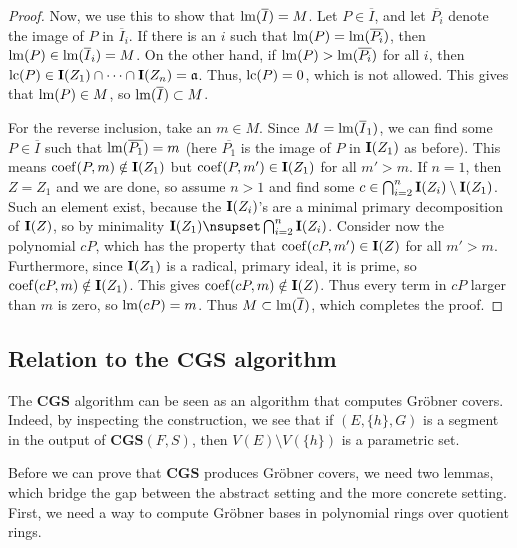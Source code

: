 \begin{proof}
  Now, we use this to show that $\operatorname{lm}(\overline I) = M$. Let $P \in \overline I$, and let $\overline{P_{i}}$ denote the image of $P$ in $\overline I_{i}$. If there is an $i$ such that $\operatorname{lm}(P) = \operatorname{lm}(\overline{P_{i}})$, then $\operatorname{lm}(P) \in \operatorname{lm}(\overline I_{i}) = M$. On the other hand, if $\operatorname{lm}(P) > \operatorname{lm}(\overline{P_{i}})$ for all $i$, then $\operatorname{lc}(P) \in \operatorname{\mathbf I}(Z_{1}) \cap \dots \cap \operatorname{\mathbf I}(Z_{n}) = \mathfrak{a}$. Thus, $\operatorname{lc}(P) = 0$, which is not allowed. This gives that $\operatorname{lm}(P) \in M$, so $\operatorname{lm}(\overline I) \subset M$.

  For the reverse inclusion, take an $m \in M$. Since $M = \operatorname{lm}(\overline I_{1})$, we can find some $P \in \overline I$ such that $\operatorname{lm}(\overline{P_{1}}) = m$ (here $\overline{P_{1}}$ is the image of $P$ in $\operatorname{\mathbf I}(Z_{1})$ as before). This means $\operatorname{coef}(P, m) \notin \operatorname{\mathbf I}(Z_{1})$ but $\operatorname{coef}(P, m') \in \operatorname{\mathbf I}(Z_{1})$ for all $m' > m$. If $n = 1$, then $Z = Z_{1}$ and we are done, so assume $n > 1$ and find some $c \in \bigcap_{i=2}^{n} \operatorname{\mathbf I}(Z_{i}) \setminus \operatorname{\mathbf I}(Z_{1})$. Such an element exist, because the $\operatorname{\mathbf I}(Z_{i})$'s are a minimal primary decomposition of $\operatorname{\mathbf I}(Z)$, so by minimality $\I(Z_{1}) \nsupset \bigcap_{i=2}^{n} \I(Z_{i})$. Consider now the polynomial $cP$, which has the property that $\operatorname{coef}(cP, m') \in \operatorname{\mathbf I}(Z)$ for all $m' > m$. Furthermore, since $\operatorname{\mathbf I}(Z_{1})$ is a radical, primary ideal, it is prime, so $\operatorname{coef}(cP, m) \notin \operatorname{\mathbf I}(Z_{1})$. This gives $\operatorname{coef}(cP, m) \notin \operatorname{\mathbf I}(Z)$. Thus every term in $cP$ larger than $m$ is zero, so $\operatorname{lm}(cP) = m$. Thus $M \subset \operatorname{lm}(\overline I)$, which completes the proof.
\end{proof}










\subsection{Relation to the $\mathbf{CGS}$ algorithm} \label{ss_covers}
The $\mathbf{CGS}$ algorithm can be seen as an algorithm that computes Gröbner covers. Indeed, by inspecting the construction, we see that if $(E, \{h\}, G)$ is a segment in the output of $\mathbf{CGS}(F, S)$, then $V(E)  \setminus V(\{h\})$ is a parametric set.

Before we can prove that $\mathbf{CGS}$ produces Gröbner covers, we need two lemmas, which bridge the gap between the abstract setting and the more concrete setting. First, we need a way to compute Gröbner bases in polynomial rings over quotient rings.

